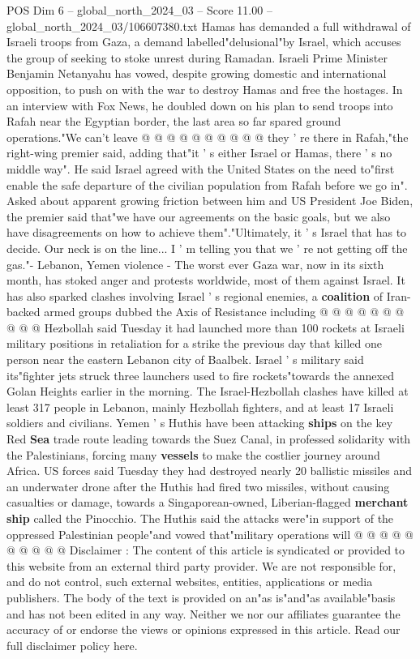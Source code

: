 \begin{textsample}{POS Dim 6 – global\_north\_2024\_03 – Score 11.00 – global\_north\_2024\_03/106607380.txt}
Hamas has demanded a full withdrawal of Israeli troops from Gaza, a demand labelled"delusional"by Israel, which accuses the group of seeking to stoke unrest during Ramadan.
Israeli Prime Minister Benjamin Netanyahu has vowed, despite growing domestic and international opposition, to push on with the war to destroy Hamas and free the hostages.
In an interview with Fox News, he doubled down on his plan to send troops into Rafah near the Egyptian border, the last area so far spared ground operations."We can't leave @ @ @ @ @ @ @ @ @ @ they ' re there in Rafah,"the right-wing premier said, adding that"it ' s either Israel or Hamas, there ' s no middle way".
He said Israel agreed with the United States on the need to"first enable the safe departure of the civilian population from Rafah before we go in".
Asked about apparent growing friction between him and US President Joe Biden, the premier said that"we have our agreements on the basic goals, but we also have disagreements on how to achieve them"."Ultimately, it ' s Israel that has to decide.
Our neck is on the line...
I ' m telling you that we ' re not getting off the gas."- Lebanon, Yemen violence - The worst ever Gaza war, now in its sixth month, has stoked anger and protests worldwide, most of them against Israel.
It has also sparked clashes involving Israel ' s regional enemies, a \textbf{coalition} of Iran-backed armed groups dubbed the Axis of Resistance including @ @ @ @ @ @ @ @ @ @ Hezbollah said Tuesday it had launched more than 100 rockets at Israeli military positions in retaliation for a strike the previous day that killed one person near the eastern Lebanon city of Baalbek.
Israel ' s military said its"fighter jets struck three launchers used to fire rockets"towards the annexed Golan Heights earlier in the morning.
The Israel-Hezbollah clashes have killed at least 317 people in Lebanon, mainly Hezbollah fighters, and at least 17 Israeli soldiers and civilians.
Yemen ' s Huthis have been attacking \textbf{ships} on the key Red \textbf{Sea} trade route leading towards the Suez Canal, in professed solidarity with the Palestinians, forcing many \textbf{vessels} to make the costlier journey around Africa.
US forces said Tuesday they had destroyed nearly 20 ballistic missiles and an underwater drone after the Huthis had fired two missiles, without causing casualties or damage, towards a Singaporean-owned, Liberian-flagged \textbf{merchant} \textbf{ship} called the Pinocchio.
The Huthis said the attacks were"in support of the oppressed Palestinian people"and vowed that"military operations will @ @ @ @ @ @ @ @ @ @ Disclaimer : The content of this article is syndicated or provided to this website from an external third party provider.
We are not responsible for, and do not control, such external websites, entities, applications or media publishers.
The body of the text is provided on an"as is"and"as available"basis and has not been edited in any way.
Neither we nor our affiliates guarantee the accuracy of or endorse the views or opinions expressed in this article.
Read our full disclaimer policy here.

\end{textsample}

